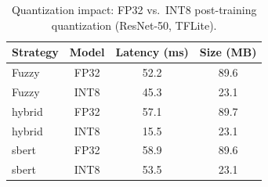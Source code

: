 \begin{table}[htbp]
\caption{Quantization impact: FP32 vs.\ INT8 post-training quantization (ResNet-50, TFLite).}
\label{tab:quantization}
\begin{tabular}{lccc}
\toprule
Strategy & Model & Latency (ms) & Size (MB) \\
\midrule
Fuzzy & FP32 & 52.2 & 89.6 \\
Fuzzy & INT8 & 45.3 & 23.1 \\
hybrid & FP32 & 57.1 & 89.7 \\
hybrid & INT8 & 15.5 & 23.1 \\
sbert & FP32 & 58.9 & 89.6 \\
sbert & INT8 & 53.5 & 23.1 \\
\bottomrule
\end{tabular}
\end{table}

